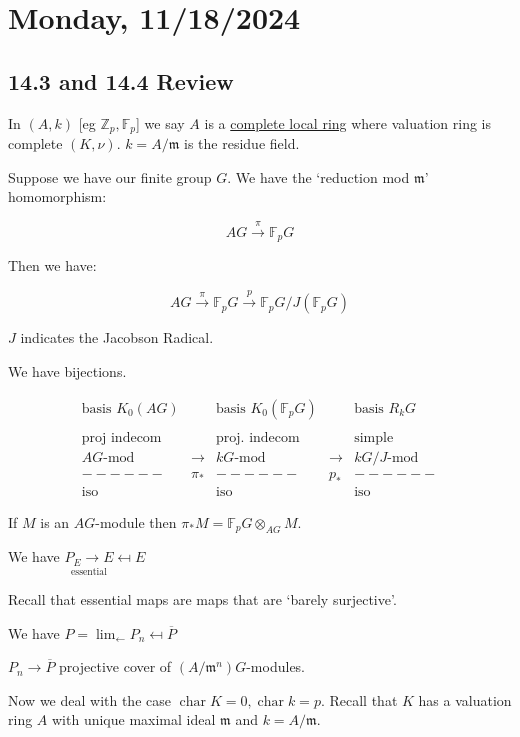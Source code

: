 \documentclass{article}
\theoremstyle{definition}
\begin{document}
\section*{Monday, 11/18/2024}

\subsection*{14.3 and 14.4 Review}

In \((A,k)\) [eg \(\mathbb{Z}_p, \mathbb{F}_p\)] we say \(A\) is a \underline{complete local ring} where valuation ring is complete \((K,\nu)\). \(k = A / \mathfrak{m}\) is the residue field.

Suppose we have our finite group \(G\). We have the `reduction mod \(\mathfrak{m}\)' homomorphism:

\[
    A G \overset{\pi}{\to} \mathbb{F}_p G
\]

Then we have:

\[
    AG \overset{\pi}{\to} \mathbb{F}_p G \overset{p}{\to} \mathbb{F}_p G / J(\mathbb{F}_p G)
\]

\(J\) indicates the Jacobson Radical.

We have bijections.

\[
    \begin{matrix}

        \text{basis } K_0(AG) & & \text{basis } K_0(\mathbb{F}_p G) & & \text{basis } R_k G \\ \\
        \text{proj indecom} & & \text{proj. indecom} & & \text{simple} \\
        AG\text{-mod} & \to & kG\text{-mod} & \to & kG/J\text{-mod} \\ - - - - - - & \pi_{\ast} & - - - - - - & p_{\ast} & - - - - - - \\
        \text{iso} & & \text{iso} & & \text{iso}
    \end{matrix}
\]

If \(M\) is an \(AG\)-module then \(\pi_{\ast} M =\mathbb{F}_p G \otimes_{AG} M\).

We have \(\underset{\text{essential}}{P_E \to E} \mapsfrom E\)

Recall that essential maps are maps that are `barely surjective'.

We have \(P = \lim_{\leftarrow} P_n \mapsfrom \overline{P}\) 

\(P_n \to \overline{P}\) projective cover of \((A / \mathfrak{m}^n)G\)-modules. 

Now we deal with the case \(\operatorname{char} K =0, \operatorname{char} k = p\). Recall that \(K\) has a valuation ring \(A\) with unique maximal ideal \(\mathfrak{m}\) and \(k = A / \mathfrak{m}\).
\end{document}
